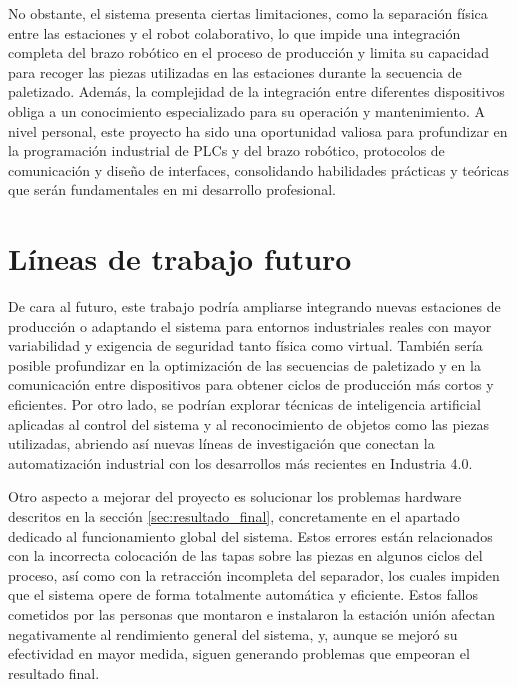 No obstante, el sistema presenta ciertas limitaciones, como la separación física entre las estaciones y el robot colaborativo, lo que impide una integración completa del brazo robótico en el proceso de producción y limita su capacidad para recoger las piezas utilizadas en las estaciones durante la secuencia de paletizado. Además, la complejidad de la integración entre diferentes dispositivos obliga a un conocimiento especializado para su operación y mantenimiento. A nivel personal, este proyecto ha sido una oportunidad valiosa para profundizar en la programación industrial de PLCs y del brazo robótico, protocolos de comunicación y diseño de interfaces, consolidando habilidades prácticas y teóricas que serán fundamentales en mi desarrollo profesional.

\section{Líneas de trabajo futuro}

De cara al futuro, este trabajo podría ampliarse integrando nuevas estaciones de producción o adaptando el sistema para entornos industriales reales con mayor variabilidad y exigencia de seguridad tanto física como virtual. También sería posible profundizar en la optimización de las secuencias de paletizado y en la comunicación entre dispositivos para obtener ciclos de producción más cortos y eficientes. Por otro lado, se podrían explorar técnicas de inteligencia artificial aplicadas al control del sistema y al reconocimiento de objetos como las piezas utilizadas, abriendo así nuevas líneas de investigación que conectan la automatización industrial con los desarrollos más recientes en Industria 4.0.

Otro aspecto a mejorar del proyecto es solucionar los problemas hardware descritos en la sección \ref{sec:resultado_final}, concretamente en el apartado dedicado al funcionamiento global del sistema. Estos errores están relacionados con la incorrecta colocación de las tapas sobre las piezas en algunos ciclos del proceso, así como con la retracción incompleta del separador, los cuales  impiden que el sistema opere de forma totalmente automática y eficiente. Estos fallos cometidos por las personas que montaron e instalaron la estación unión afectan negativamente al rendimiento general del sistema, y, aunque se mejoró su efectividad en mayor medida, siguen generando problemas que empeoran el resultado final.
